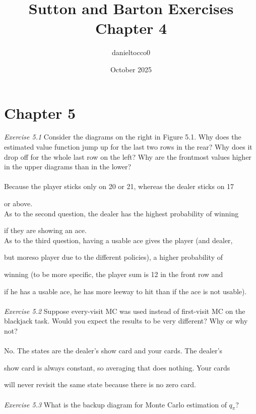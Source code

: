 \documentclass{article}
\title{Sutton and Barton Exercises Chapter 4}
\author{danieltocco0 }
\date{October 2025}
\begin{document}
\maketitle

\section{Chapter 5}
\textit{Exercise 5.1} Consider the diagrams on the right in Figure 5.1. Why does the estimated
value function jump up for the last two rows in the rear? Why does it drop off for the
whole last row on the left? Why are the frontmost values higher in the upper diagrams
than in the lower?
\\
\\

Because the player sticks only on 20 or 21, whereas the dealer sticks on 17

or above. \\

As to the second question, the dealer has the highest probability of winning 

if they are showing an ace. \\

As to the third question, having a usable ace gives the player (and dealer, 

but moreso player due to the different policies), a higher probability of 

winning (to be more specific, the player sum is 12 in the front row and 

if he has a usable ace, he has more leeway to hit than if the ace is not usable). 
\\\\
\textit{Exercise 5.2} Suppose every-visit MC was used instead of first-visit MC on the blackjack
task. Would you expect the results to be very different? Why or why not?
\\
\\

No. The states are the dealer's show card and your cards. The dealer's 

show card is always constant, so averaging that does nothing. Your cards 

will never revisit the same state because there is no zero card.
\\\\
\textit{Exercise 5.3} What is the backup diagram for Monte Carlo estimation of $q_{\pi}$? 
\\
\\
\end{document}
